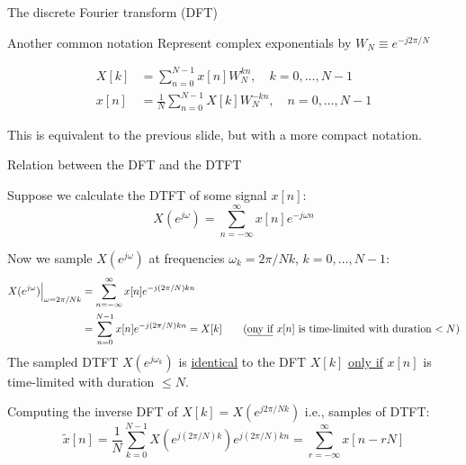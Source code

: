 \documentclass[10pt, handout]{beamer}
\begin{document}
%
\begin{frame}{The discrete Fourier transform (DFT)}
\begin{block}{Another common notation}
	Represent complex exponentials by $W_N \equiv e^{-j2\pi/N}$
	
	\begin{align}
	X[k] &= \sum_{n = 0}^{N-1}x[n]W_N^{kn}, \quad k = 0, \ldots, N-1 \tag{direct transform} \\
	x[n] &= \frac{1}{N}\sum_{n = 0}^{N-1}X[k]W_N^{-kn}, \quad n = 0, \ldots, N-1 \tag{inverse transform}
	\end{align}
\end{block}	
This is equivalent to the previous slide, but with a more compact notation.
\end{frame}

%
\begin{frame}{Relation between the DFT and the DTFT}

Suppose we calculate the DTFT of some signal $x[n]$:
\begin{equation*}
X(e^{j\omega}) = \sum_{n=-\infty}^{\infty} x[n]e^{-j\omega n} \tag{DTFT of $x[n]$}
\end{equation*}

\pause
Now we sample $X(e^{j\omega})$ at frequencies $\omega_k = 2\pi/Nk$, $k = 0, \ldots, N-1$:
\begin{align*}
	X(e^{j\omega})\Big|_{\omega = 2\pi/Nk} &= \sum_{n=-\infty}^{\infty}x[n]e^{-j(2\pi/N)kn} \\
	&= \sum_{n=0}^{N-1}x[n]e^{-j(2\pi/N)kn}= X[k] \tag{\underline{ony if} $x[n]$ is time-limited with duration $< N$}
\end{align*}
The sampled DTFT $X(e^{j\omega_k})$ is \underline{identical} to the DFT $X[k]$ \underline{only if} $x[n]$ is time-limited with duration $\leq N$.

\pause
Computing the inverse DFT of $X[k] = X(e^{j2\pi/Nk})$ i.e., samples of DTFT:
\begin{equation} \label{eq:replicated_xn}
	\tilde{x}[n] = \frac{1}{N}\sum_{k=0}^{N-1}X(e^{j(2\pi/N)k})e^{j(2\pi/N)kn} = \sum_{r=-\infty}^{\infty} x[n-rN]
\end{equation}
\end{frame}
\end{document}
